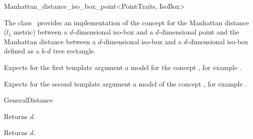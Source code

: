 

\begin{ccRefClass}{Manhattan_distance_iso_box_point<PointTraits, IsoBox>}  %


\ccDefinition
  
The class \ccRefName\ provides an implementation of
the  concept
for the Manhattan distance ($l_1$ metric)
between a $d$-dimensional iso-box and a $d$-dimensional point 
and the Manhattan distance between a $d$-dimensional iso-box
and a $d$-dimensional iso-box defined as a $k$-$d$ tree rectangle.


\ccParameters
Expects for the first template argument
a model for the concept , for example .

Expects for the second template argument a model
of the concept ,
for example .


\ccIsModel

GeneralDistance

\ccTypes


\ccCreation
{}  %


\ccOperations

 {Returns $d$.}

 {Returns $d$.}


\end{ccRefClass}
